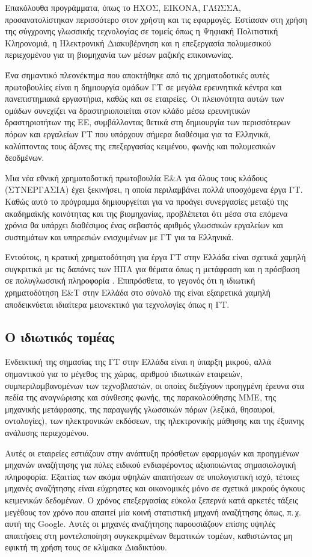 \documentclass[]{../../metanetpaper}
\begin{document}
\begin{multicols}{2}
Επακόλουθα προγράμματα, όπως το ΗΧΟΣ, ΕΙΚΟΝΑ, ΓΛΩΣΣΑ, προσανατολίστηκαν περισσότερο στον χρήστη και τις εφαρμογές. Εστίασαν στη χρήση της σύγχρονης γλωσσικής τεχνολογίας σε τομείς όπως η Ψηφιακή Πολιτιστική Κληρονομιά, η Ηλεκτρονική Διακυβέρνηση και η επεξεργασία πολυμεσικού περιεχομένου για τη βιομηχανία των μέσων μαζικής επικοινωνίας.

Ένα σημαντικό πλεονέκτημα που αποκτήθηκε από τις χρηματοδοτικές αυτές πρωτοβουλίες είναι η δημιουργία ομάδων ΓΤ σε μεγάλα ερευνητικά κέντρα και πανεπιστημιακά εργαστήρια, καθώς και σε εταιρείες. Οι πλειονότητα αυτών των ομάδων συνεχίζει να δραστηριοποιείται στον κλάδο μέσω ερευνητικών δραστηριοτήτων της ΕΕ, συμβάλλοντας θετικά στη δημιουργία των περισσότερων πόρων και εργαλείων ΓΤ που υπάρχουν σήμερα διαθέσιμα για τα Ελληνικά, καλύπτοντας τους άξονες της επεξεργασίας κειμένου, φωνής και πολυμεσικών δεοδμένων. 

Μια νέα εθνική χρηματοδοτική πρωτοβουλία Ε\&Α για όλους τους κλάδους (ΣΥΝΕΡΓΑΣΙΑ) έχει ξεκινήσει, η οποία περιλαμβάνει πολλά υποσχόμενα έργα ΓΤ. Καθώς αυτό το πρόγραμμα δημιουργείται για να προάγει συνεργασίες μεταξύ της ακαδημαϊκής κοινότητας και της βιομηχανίας, προβλέπεται ότι μέσα στα επόμενα χρόνια θα υπάρχει διαθέσιμος ένας σεβαστός αριθμός γλωσσικών εργαλείων και συστημάτων και υπηρεσιών ενισχυμένων με ΓΤ για τα Ελληνικά.

Εντούτοις, η κρατική χρηματοδότηση για έργα ΓΤ στην Ελλάδα είναι σχετικά χαμηλή συγκριτικά με τις δαπάνες των ΗΠΑ για θέματα όπως η μετάφραση και η πρόσβαση σε πολυγλωσσική πληροφορία \cite{laz2}. Επιπρόσθετα, το γεγονός ότι η ιδιωτική χρηματοδότηση Ε\&Τ στην Ελλάδα στο σύνολό της είναι εξαιρετικά χαμηλή αποδεικνύεται ιδιαίτερα μειονεκτικό για τεχνολογίες όπως η ΓΤ.

\subsection{Ο ιδιωτικός τομέας}

Ενδεικτική της σημασίας της ΓΤ στην Ελλάδα είναι η ύπαρξη μικρού, αλλά σημαντικού για το μέγεθος της χώρας, αριθμού ιδιωτικών εταιρειών, συμπεριλαμβανομένων των τεχνοβλαστών, οι οποίες διεξάγουν προηγμένη έρευνα στα πεδία της αναγνώρισης και σύνθεσης φωνής, της παρακολούθησης ΜΜΕ, της μηχανικής μετάφρασης, της παραγωγής γλωσσικών πόρων (λεξικά, θησαυροί, οντολογίες), των ηλεκτρονικών εκδόσεων, της ηλεκτρονικής μάθησης και της έξυπνης ανάλυσης περιεχομένου.

Αυτές οι εταιρείες εστιάζουν στην ανάπτυξη πρόσθετων  εφαρμογών και προηγμένων μηχανών αναζήτησης για πύλες ειδικού ενδιαφέροντος αξιοποιώντας σημασιολογική πληροφορία. Εξαιτίας των ακόμα υψηλών απαιτήσεων σε υπολογιστική ισχύ, τέτοιες μηχανές αναζήτησης είναι εύχρηστες και οικονομικές  μόνο σε σχετικά μικρούς όγκους κειμενικών δεδομένων. Ο χρόνος επεξεργασίας εύκολα ξεπερνά κατά αρκετές τάξεις μεγέθους τον χρόνο που απαιτεί μία κοινή  στατιστική μηχανή αναζήτησης όπως, π.\,χ. αυτή της Google. Αυτές οι μηχανές αναζήτησης παρουσιάζουν επίσης υψηλές απαιτήσεις  στη μοντελοποίηση συγκεκριμένων θεματικών τομέων, καθιστώντας μη εφικτή τη χρήση τους σε  κλίμακα Διαδικτύου.


\end{multicols}
\end{document}
